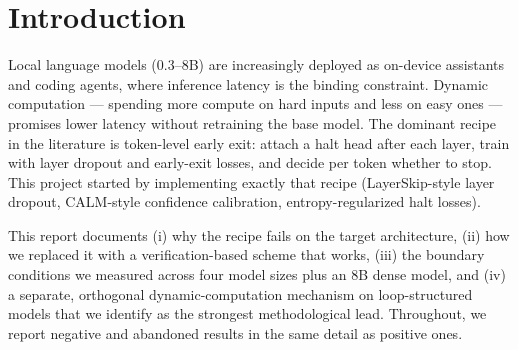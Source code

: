 \documentclass[11pt,a4paper]{article}
\begin{document}
\section{Introduction}
Local language models (0.3--8B) are increasingly deployed as on-device assistants and coding
agents, where inference latency is the binding constraint. Dynamic computation --- spending
more compute on hard inputs and less on easy ones --- promises lower latency without retraining
the base model. The dominant recipe in the literature is token-level early exit: attach a halt
head after each layer, train with layer dropout and early-exit losses, and decide per token
whether to stop. This project started by implementing exactly that recipe (LayerSkip-style
layer dropout, CALM-style confidence calibration, entropy-regularized halt losses).

This report documents (i) why the recipe fails on the target architecture, (ii) how we replaced
it with a verification-based scheme that works, (iii) the boundary conditions we measured
across four model sizes plus an 8B dense model, and (iv) a separate, orthogonal
dynamic-computation mechanism on loop-structured models that we identify as the strongest
methodological lead. Throughout, we report negative and abandoned results in the same detail
as positive ones.
\end{document}
